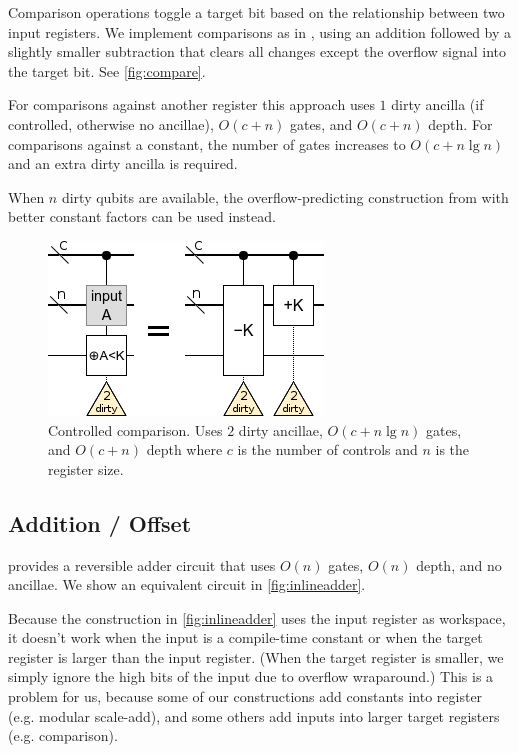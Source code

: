 \documentclass[twocolumn,longbibliography]{quantumarticle}
\begin{document}
Comparison operations toggle a target bit based on the relationship between two input registers.
We implement comparisons as in \cite{takahashi2005}, using an addition followed by a slightly smaller subtraction that clears all changes except the overflow signal into the target bit.
See \autoref{fig:compare}.

For comparisons against another register this approach uses $1$ dirty ancilla (if controlled, otherwise no ancillae), $O(c + n)$ gates, and $O(c + n)$ depth.
For comparisons against a constant, the number of gates increases to $O(c + n \lg n)$ and an extra dirty ancilla is required.

When $n$ dirty qubits are available, the overflow-predicting construction from \cite{haner2016} with better constant factors can be used instead.


\begin{figure}
  \centering
  \includegraphics[width=\linewidth]{assets/comparison-less-const.png}
  \caption{
    Controlled comparison.
    Uses $2$ dirty ancillae, $O(c + n \lg n)$ gates, and $O(c + n)$ depth where $c$ is the number of controls and $n$ is the register size.
  }
  \label{fig:compare}
\end{figure}


\subsection{Addition / Offset}

\cite{takahashi2005} provides a reversible adder circuit that uses $O(n)$ gates, $O(n)$ depth, and no ancillae.
We show an equivalent circuit in \autoref{fig:inlineadder}.

Because the construction in \autoref{fig:inlineadder} uses the input register as workspace, it doesn't work when the input is a compile-time constant or when the target register is larger than the input register.
(When the target register is smaller, we simply ignore the high bits of the input due to overflow wraparound.)
This is a problem for us, because some of our constructions add constants into register (e.g. modular scale-add), and some others add inputs into larger target registers (e.g. comparison).
\end{document}

